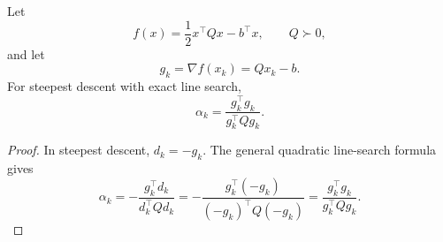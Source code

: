 \begin{algorithm}[H]
	\DontPrintSemicolon
	\caption{Steepest Descent with Line Search}
\label{alg:l2-steepest-descent-with-line-search}
\end{algorithm}

\begin{theorem}\label{thm:l2-exact-line-search-step-for-a-quadratic}
	Let
	\[
		f(x)=\frac{1}{2}x^\top Qx-b^\top x,
		\qquad Q \succ 0,
	\]
	and let
	\[
		g_k=\nabla f(x_k)=Qx_k-b.
	\]
	For steepest descent with exact line search,
	\[
		\alpha_k = \frac{g_k^\top g_k}{g_k^\top Q g_k}.
	\]
\end{theorem}
\begin{proof}
	In steepest descent, $d_k=-g_k$. The general quadratic line-search formula gives
	\[
		\alpha_k
		= -\frac{g_k^\top d_k}{d_k^\top Q d_k}
		= -\frac{g_k^\top(-g_k)}{(-g_k)^\top Q(-g_k)}
		= \frac{g_k^\top g_k}{g_k^\top Qg_k}.
	\]
\end{proof}

